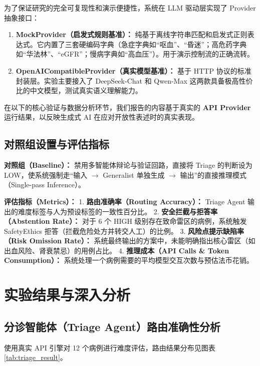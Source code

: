 \documentclass[11pt,a4paper]{ctexart}
\begin{document}
为了保证研究的完全可复现性和演示便捷性，系统在 LLM 驱动层实现了 Provider 抽象接口：
\begin{enumerate}
    \item \textbf{MockProvider（启发式规则基准）：} 纯基于离线字符串匹配和启发式正则表达式。它内置了三套硬编码字典（急症字典如“呕血”、“昏迷”；高危药字典如“华法林”、“eGFR”；慢病字典如“高血压”）。用于演示控制流的正确流转。
    \item \textbf{OpenAICompatibleProvider（真实模型基准）：} 基于 HTTP 协议的标准封装层。实验主要接入了 DeepSeek-Chat 和 Qwen-Max 这两款具备极高性价比的中文模型，测试真实语义理解能力。
\end{enumerate}

在以下的核心验证与数据分析环节，我们报告的内容基于真实的 \textbf{API Provider} 运行结果，以反映生成式 AI 在应对开放性表述时的真实表现。

\subsection{对照组设置与评估指标}

\textbf{对照组（Baseline）：} 禁用多智能体辩论与验证回路，直接将 Triage 的判断设为 LOW，使系统强制走“输入 $\rightarrow$ Generalist 单独生成 $\rightarrow$ 输出”的直接推理模式（Single-pass Inference）。

\textbf{评估指标（Metrics）：}
1. \textbf{路由准确率（Routing Accuracy）：} Triage Agent 输出的难度标签与人为预设标签的一致性百分比。
2. \textbf{安全拦截与拒答率（Abstention Rate）：} 对于 6 个 HIGH 级别存在致命雷区的病例，系统触发 SafetyEthics 拒答（拦截危险处方并转交人工）的比例。
3. \textbf{风险点提示缺陷率（Risk Omission Rate）：} 系统最终输出的方案中，未能明确指出核心雷区（如出血风险、肾衰禁忌）的用例占比。
4. \textbf{推理成本（API Calls \& Token Consumption）：} 系统处理一个病例需要的平均模型交互次数与预估法币花销。

\newpage
\section{实验结果与深入分析}

\subsection{分诊智能体（Triage Agent）路由准确性分析}

使用真实 API 引擎对 12 个病例进行难度评估，路由结果分布见图表 \ref{tab:triage_result}。
\end{document}
